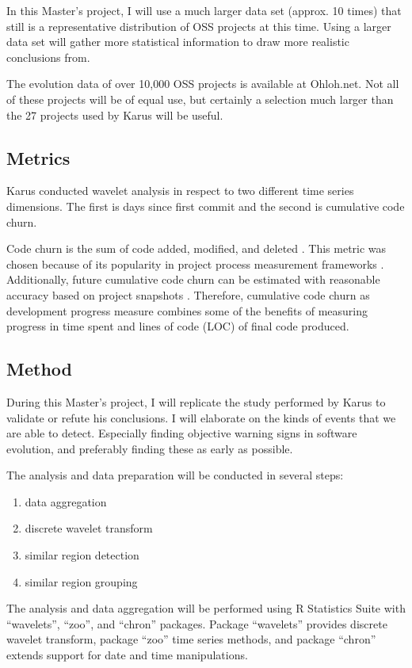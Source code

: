 In this Master's project, I will use a much larger data set (approx. 10
times) that still is a representative distribution of OSS projects at this time.
Using a larger data set will gather more statistical information to draw more
realistic conclusions from.

The evolution data of over 10,000 OSS projects is available at Ohloh.net. Not
all of these projects will be of equal use, but certainly a selection much
larger than the 27 projects used by Karus will be useful.

\subsection{Metrics}
Karus conducted wavelet analysis in respect to two different time series
dimensions. The first is days since first commit and the second is cumulative
code churn.

Code churn is the sum of code added, modified, and deleted \cite{elbaum}. This
metric was chosen because of its popularity in project process measurement
frameworks \cite{karus2013}. Additionally, future cumulative code churn can be
estimated with reasonable accuracy based on project snapshots \cite{dumas}.
Therefore, cumulative code churn as development progress measure combines some
of the benefits of measuring progress in time spent and lines of code (LOC) of
final code produced.

\subsection{Method}
During this Master's project, I will replicate the study performed by Karus to
validate or refute his conclusions. I will elaborate on the kinds of events
that we are able to detect. Especially finding objective warning signs in
software evolution, and preferably finding these as early as possible.

The analysis and data preparation will be conducted in several steps:
\begin{enumerate}
	\item data aggregation
	\item discrete wavelet transform
	\item similar region detection
	\item similar region grouping
\end{enumerate}
The analysis and data aggregation will be performed using R Statistics Suite
with ``wavelets'', ``zoo'', and ``chron'' packages. Package ``wavelets''
provides discrete wavelet transform, package ``zoo'' time series methods, and
package ``chron'' extends support for date and time manipulations.

